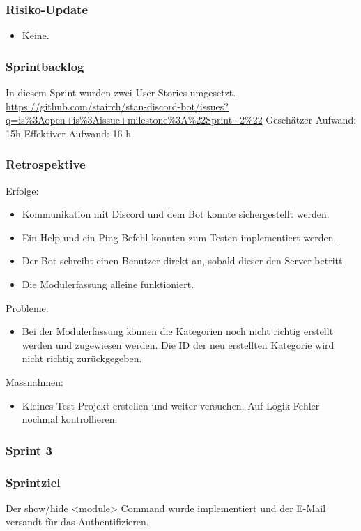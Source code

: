\documentclass[a4paper, table]{article}
\begin{document}
\subsubsection*{Risiko-Update}
\begin{itemize}
    \item Keine.
\end{itemize}

\subsubsection*{Sprintbacklog}
In diesem Sprint wurden zwei User-Stories umgesetzt.\\
\url{https://github.com/stairch/stan-discord-bot/issues?q=is%3Aopen+is%3Aissue+milestone%3A%22Sprint+2%22}
\newline
Geschätzer Aufwand: 15h
\newline
Effektiver Aufwand: 16 h

\subsubsection*{Retrospektive}
Erfolge:
\begin{itemize}
    \item Kommunikation mit Discord und dem Bot konnte sichergestellt werden.
    \item Ein Help und ein Ping Befehl konnten zum Testen implementiert werden.
    \item Der Bot schreibt einen Benutzer direkt an, sobald dieser den Server betritt.
    \item Die Modulerfassung alleine funktioniert.
\end{itemize}
Probleme:
\begin{itemize}
    \item Bei der Modulerfassung können die Kategorien noch nicht richtig erstellt werden und zugewiesen werden.
    Die ID der neu erstellten Kategorie wird nicht richtig zurückgegeben.
\end{itemize}
Massnahmen:
\begin{itemize}
    \item Kleines Test Projekt erstellen und weiter versuchen. Auf Logik-Fehler nochmal kontrollieren.
\end{itemize}
\newpage

\subsubsection{Sprint 3}
\subsubsection*{Sprintziel}
Der show/hide <module> Command wurde implementiert und der E-Mail versandt für das Authentifizieren.
\end{document}
